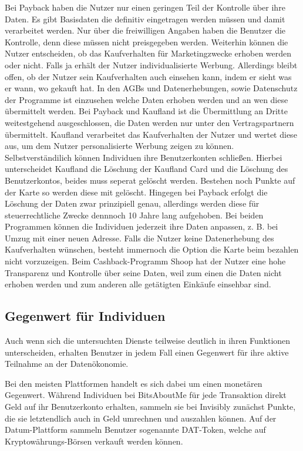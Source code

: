 \noindent Bei Payback haben die Nutzer nur einen geringen Teil der Kontrolle über ihre Daten. Es gibt Basisdaten die definitiv eingetragen werden müssen und damit verarbeitet werden. Nur über die freiwilligen Angaben haben die Benutzer die Kontrolle, denn diese müssen nicht preisgegeben werden. Weiterhin können die Nutzer entscheiden, ob das Kaufverhalten für Marketingzwecke erhoben werden oder nicht. Falls ja erhält der Nutzer individualisierte Werbung. Allerdings bleibt offen, ob der Nutzer sein Kaufverhalten auch einsehen kann, indem er sieht was er wann, wo gekauft hat. In den AGBs und Datenerhebungen, sowie Datenschutz der Programme ist einzusehen welche Daten erhoben werden und an wen diese übermittelt werden. Bei Payback und Kaufland ist die Übermittlung an Dritte weitestgehend ausgeschlossen, die Daten werden nur unter den Vertragspartnern übermittelt.
Kaufland verarbeitet das Kaufverhalten der Nutzer und wertet diese aus, um dem Nutzer personalisierte Werbung zeigen zu können. Selbstverständilich können Individuen ihre Benutzerkonten schließen. Hierbei unterscheidet Kaufland die Löschung der Kaufland Card und die Löschung des Benutzerkontos, beides muss seperat gelöscht werden. Bestehen noch Punkte auf der Karte so werden diese mit gelöscht. Hingegen bei Payback erfolgt die Löschung der Daten zwar prinzipiell genau, allerdings werden diese für steuerrechtliche Zwecke dennnoch 10 Jahre lang aufgehoben. Bei beiden Programmen können die Individuen jederzeit ihre Daten anpassen, z. B. bei Umzug mit einer neuen Adresse. Falls die Nutzer keine Datenerhebung des Kaufverhalten wünschen, besteht immernoch die Option die Karte beim bezahlen nicht vorzuzeigen.
Beim Cashback-Programm Shoop hat der Nutzer eine hohe Transparenz und Kontrolle über seine Daten, weil zum einen die Daten nicht erhoben werden und zum anderen alle getätigten Einkäufe einsehbar sind.

\subsection{Gegenwert für Individuen}
Auch wenn sich die untersuchten Dienste teilweise deutlich in ihren Funktionen unterscheiden, erhalten Benutzer in jedem Fall einen Gegenwert für ihre aktive Teilnahme an der Datenökonomie. \newline

\noindent Bei den meisten Plattformen handelt es sich dabei um einen monetären Gegenwert. Während Individuen bei BitsAboutMe für jede Transaktion direkt Geld auf ihr Benutzerkonto erhalten, sammeln sie bei Invisibly zunächst Punkte, die sie letztendlich auch in Geld umrechnen und auszahlen können. Auf der Datum-Plattform sammeln Benutzer sogenannte DAT-Token, welche auf Kryptowährungs-Börsen verkauft werden können. \newline


